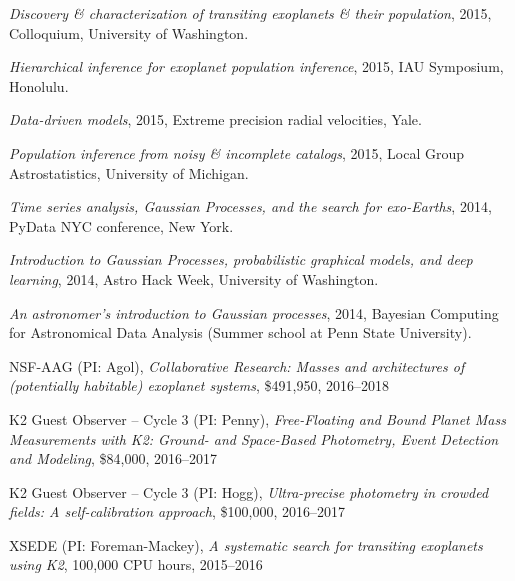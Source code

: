 \documentclass[12pt,letterpaper]{article}
\begin{document}
\begin{list}{}{\cvlist}
\item \emph{Discovery \& characterization of transiting exoplanets \& their
    population}, 2015, Colloquium, University of Washington.

\item \emph{Hierarchical inference for exoplanet population inference},
    2015, IAU Symposium, Honolulu.

\item \emph{Data-driven models}, 2015, Extreme precision radial velocities,
    Yale.

\item \emph{Population inference from noisy \& incomplete catalogs}, 2015,
    Local Group Astrostatistics, University of Michigan.

\item \emph{Time series analysis, Gaussian Processes, and the search for
            exo-Earths},
    2014, PyData NYC conference, New York.

\item \emph{Introduction to Gaussian Processes, probabilistic graphical
            models, and deep learning},
    2014, Astro Hack Week, University of Washington.

\item \emph{An astronomer's introduction to Gaussian processes},
    2014, Bayesian Computing for Astronomical Data Analysis (Summer school at
    Penn State University).

\end{list}

\begin{list}{}{\cvlist}

\end{list}

\begin{list}{}{\cvlist}
\item
NSF-AAG (PI: Agol),
\emph{Collaborative Research: Masses and architectures of (potentially
    habitable) exoplanet systems},
\$491,950, 2016--2018
\item
K2 Guest Observer -- Cycle 3 (PI: Penny),
\emph{Free-Floating and Bound Planet Mass Measurements with K2: Ground- and
Space-Based Photometry, Event Detection and Modeling},
\$84,000, 2016--2017
\item
K2 Guest Observer -- Cycle 3 (PI: Hogg),
\emph{Ultra-precise photometry in crowded fields: A self-calibration
approach},
\$100,000, 2016--2017
\item
XSEDE (PI: Foreman-Mackey),
\emph{A systematic search for transiting exoplanets using K2},
100,000 CPU hours, 2015--2016
\end{list}
\end{document}

